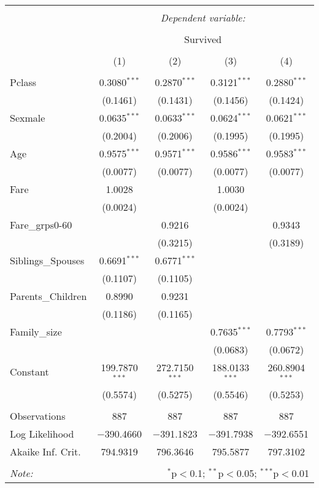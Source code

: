 \documentclass[
]{article}
\begin{document}
\begingroup 
\small 
\begin{tabular}{@{\extracolsep{5pt}}lcccc} 
\\[-1.8ex]\hline 
\hline \\[-1.8ex] 
 & \multicolumn{4}{c}{\textit{Dependent variable:}} \\ 
\cline{2-5} 
\\[-1.8ex] & \multicolumn{4}{c}{Survived} \\ 
\\[-1.8ex] & (1) & (2) & (3) & (4)\\ 
\hline \\[-1.8ex] 
 Pclass & 0.3080$^{***}$ & 0.2870$^{***}$ & 0.3121$^{***}$ & 0.2880$^{***}$ \\ 
  & (0.1461) & (0.1431) & (0.1456) & (0.1424) \\ 
  Sexmale & 0.0635$^{***}$ & 0.0633$^{***}$ & 0.0624$^{***}$ & 0.0621$^{***}$ \\ 
  & (0.2004) & (0.2006) & (0.1995) & (0.1995) \\ 
  Age & 0.9575$^{***}$ & 0.9571$^{***}$ & 0.9586$^{***}$ & 0.9583$^{***}$ \\ 
  & (0.0077) & (0.0077) & (0.0077) & (0.0077) \\ 
  Fare & 1.0028 &  & 1.0030 &  \\ 
  & (0.0024) &  & (0.0024) &  \\ 
  Fare\_grps0-60 &  & 0.9216 &  & 0.9343 \\ 
  &  & (0.3215) &  & (0.3189) \\ 
  Siblings\_Spouses & 0.6691$^{***}$ & 0.6771$^{***}$ &  &  \\ 
  & (0.1107) & (0.1105) &  &  \\ 
  Parents\_Children & 0.8990 & 0.9231 &  &  \\ 
  & (0.1186) & (0.1165) &  &  \\ 
  Family\_size &  &  & 0.7635$^{***}$ & 0.7793$^{***}$ \\ 
  &  &  & (0.0683) & (0.0672) \\ 
  Constant & 199.7870$^{***}$ & 272.7150$^{***}$ & 188.0133$^{***}$ & 260.8904$^{***}$ \\ 
  & (0.5574) & (0.5275) & (0.5546) & (0.5253) \\ 
 \hline \\[-1.8ex] 
Observations & 887 & 887 & 887 & 887 \\ 
Log Likelihood & $-$390.4660 & $-$391.1823 & $-$391.7938 & $-$392.6551 \\ 
Akaike Inf. Crit. & 794.9319 & 796.3646 & 795.5877 & 797.3102 \\ 
\hline 
\hline \\[-1.8ex] 
\textit{Note:}  & \multicolumn{4}{r}{$^{*}$p$<$0.1; $^{**}$p$<$0.05; $^{***}$p$<$0.01} \\ 
\end{tabular} 
\endgroup
\end{document}
